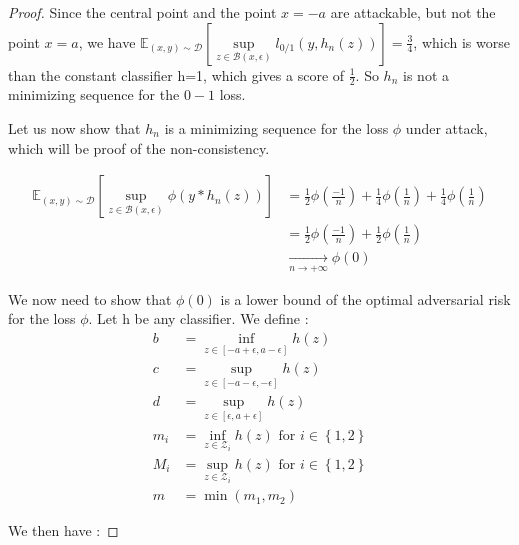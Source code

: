 \begin{proof}
Since the central point and the point $x=-a$ are attackable, but not the point $x=a$, we have $\mathbb{E}_{(x,y)\sim \mathcal{D}}\left[ \sup\limits_{z \in \mathcal{B}(x,\epsilon)} l_{0/1}(y,h_n(z))\right] = \frac{3}{4}$, which is worse than the constant classifier h=1, which gives a score of $\frac{1}{2}$. So $h_n$ is not a minimizing sequence for the $0-1$ loss.

Let us now show that $h_n$ is a minimizing sequence for the loss $\phi$ under attack, which will be proof of the non-consistency.

\begin{align*}
    \mathbb{E}_{(x,y)\sim \mathcal{D}}\left[ \sup\limits_{z \in \mathcal{B}(x,\epsilon)} \phi(y*h_n(z))\right] &= \frac{1}{2} \phi(\frac{-1}{n}) +\frac{1}{4}\phi(\frac{1}{n}) + \frac{1}{4}\phi(\frac{1}{n})\\
    &=\frac{1}{2}\phi(\frac{-1}{n}) + \frac{1}{2}\phi(\frac{1}{n}) \\
    &\underset{n\to +\infty}{\longrightarrow}\phi(0)
\end{align*}

We now need to show that $\phi(0)$ is a lower bound of the optimal adversarial risk for the loss $\phi$.
Let h be any  classifier. We define :
\begin{align*}
b &= \inf\limits_{z \in \left[ -a + \epsilon, a- \epsilon \right]} h(z) \\
c &= \sup\limits_{z \in \left[ -a - \epsilon, -\epsilon \right]} h(z) \\
d &= \sup\limits_{z \in \left[\epsilon, a + \epsilon \right]} h(z) \\
m_i &= \inf\limits_{z \in \mathcal{Z}_i} h(z) \mbox{  for  }i \in \left\{ 1,2\right\} \\
M_i &= \sup\limits_{z \in \mathcal{Z}_i} h(z) \mbox{  for  }i \in \left\{ 1,2\right\} \\
m &= \min(m_1,m_2)
\end{align*}

We then have :


\end{proof}
